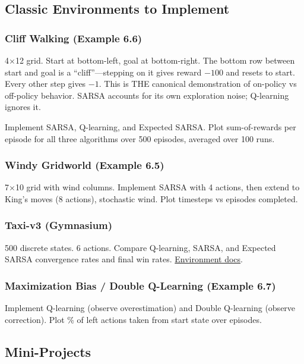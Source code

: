 \documentclass[11pt,letterpaper]{article}
\begin{document}
\subsection{Classic Environments to Implement}

\subsubsection{Cliff Walking (Example 6.6)}

4$\times$12 grid. Start at bottom-left, goal at bottom-right. The bottom row between start and goal is a ``cliff''---stepping on it gives reward $-100$ and resets to start. Every other step gives $-1$. This is THE canonical demonstration of on-policy vs off-policy behavior. SARSA accounts for its own exploration noise; Q-learning ignores it.

Implement SARSA, Q-learning, and Expected SARSA. Plot sum-of-rewards per episode for all three algorithms over 500 episodes, averaged over 100 runs.

\subsubsection{Windy Gridworld (Example 6.5)}

7$\times$10 grid with wind columns. Implement SARSA with 4 actions, then extend to King's moves (8 actions), stochastic wind. Plot timesteps vs episodes completed.

\subsubsection{Taxi-v3 (Gymnasium)}

500 discrete states. 6 actions. Compare Q-learning, SARSA, and Expected SARSA convergence rates and final win rates. \href{https://gymnasium.farama.org/environments/toy_text/taxi/}{Environment docs}.

\subsubsection{Maximization Bias / Double Q-Learning (Example 6.7)}

Implement Q-learning (observe overestimation) and Double Q-learning (observe correction). Plot \% of left actions taken from start state over episodes.

\subsection{Mini-Projects}
\end{document}
